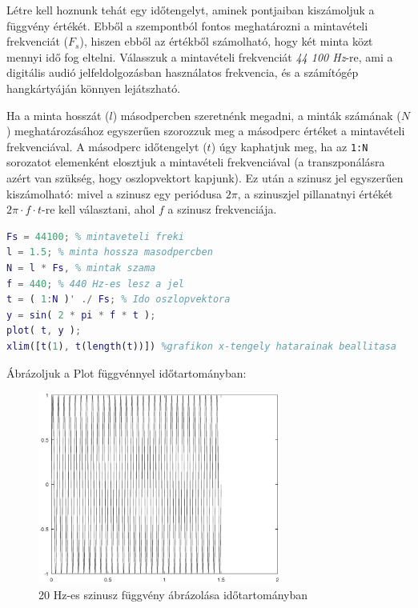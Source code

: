 \documentclass[12pt,a4paper]{article}
\begin{document}
Létre kell hoznunk tehát egy időtengelyt, aminek pontjaiban kiszámoljuk a függvény értékét. Ebből a szempontból fontos meghatározni a mintavételi frekvenciát ($F_s$), hiszen ebből az értékből számolható, hogy két minta közt mennyi idő fog eltelni. Válasszuk a mintavételi frekvenciát \textit{44 100 Hz}-re, ami a digitális audió jelfeldolgozásban használatos frekvencia, és a számítógép hangkártyáján könnyen lejátszható.

Ha a minta hosszát ($l$) másodpercben szeretnénk megadni, a minták számának ($N$) meghatározásához egyszerűen szorozzuk meg a másodperc értéket a mintavételi frekvenciával. A másodperc időtengelyt ($t$) úgy kaphatjuk meg, ha az \texttt{1:N} sorozatot elemenként elosztjuk a mintavételi frekvenciával (a transzponálásra azért van szükség, hogy oszlopvektort kapjunk). Ez után a szinusz jel egyszerűen kiszámolható: mivel a szinusz egy periódusa $2\pi$, a szinuszjel pillanatnyi értékét $2\pi \cdot f \cdot t$-re kell választani, ahol $f$ a szinusz frekvenciája.

\begin{lstlisting}[frame=single,language=matlab,caption=Mintavételi frekvencia beállítása és szinuszjel előállítása]
Fs = 44100; % mintaveteli freki
l = 1.5; % minta hossza masodpercben
N = l * Fs, % mintak szama
f = 440; % 440 Hz-es lesz a jel
t = ( 1:N )' ./ Fs; % Ido oszlopvektora
y = sin( 2 * pi * f * t );
plot( t, y );
xlim([t(1), t(length(t))]) %grafikon x-tengely hatarainak beallitasa
\end{lstlisting}

\clearpage
Ábrázoljuk a Plot függvénnyel időtartományban:

\begin{figure}[H]
\begin{center}
\includegraphics[width=8cm]{figures/modulaciok_workshop_szinusz.eps}
\caption{20 Hz-es szinusz függvény ábrázolása időtartományban}
\label{fig:szinusz}
\end{center}
\end{figure}
\end{document}
